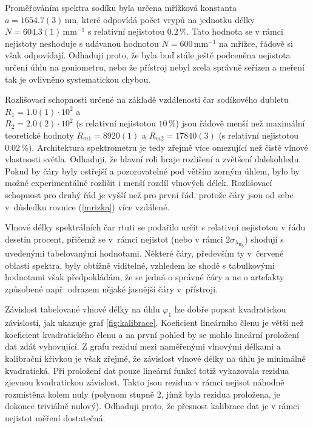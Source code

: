 \documentclass{../concepts/titul_protokol_p/prepareprotokol} %
\begin{document}
Proměřováním spektra sodíku byla určena mřížková konstanta $a = 1654.7(3)\,\mathrm{nm}$,
které odpovídá počet vrypů na jednotku délky $N = 604.3(1)\,\mathrm{mm^{-1}}$
s relativní nejistotou $0.2\,\%$. Tato hodnota se v rámci nejistoty neshoduje
s udávanou hodnotou $N = 600\,\mathrm{mm^{-1}}$ na mřížce, řádově si však
odpovídají. Odhaduji proto, že byla buď stále ještě podceněna nejistota
určení úhlu na goniometru, nebo že přístroj nebyl zcela správně seřízen
a meření tak je ovlivněno systematickou chybou.

Rozlišovací schopnosti určené na základě vzdálenosti čar sodíkového dubletu
$R_1 = 1.0(1) \cdot 10^2$ a \\ $R_2 = 2.0(2) \cdot 10^2$
(s relativní nejistotou $10\,\%$) jsou řádově menší
než maximální teoretické hodnoty $R_{m1} = 8920(1)$ a $R_{m2} = 17840(3)$
(s relativní nejistotou $0.02\,\%$).
Architektura spektrometru je tedy zřejmě více omezující než čistě vlnové 
vlastnosti světla. Odhaduji, že hlavní roli hraje rozlišení a zvětšení
dalekohledu. Pokud by čáry byly ostřejší a pozorovatelné pod větším
zorným úhlem, bylo by možné experimentálně rozlišit i menší rozdíl vlnových
délek. Rozlišovací schopnost pro druhý řád je vyšší než pro první řád,
protože čáry jsou od sebe v~důsledku rovnice (\ref{mrizka}) více vzdálené.

Vlnové délky spektrálních čar rtuti se podařilo určit s relativní nejistotou
v řádu desetin procent, přičemž se v~rámci nejistot (nebo v rámci $2 \sigma_{\lambda_\mathrm{Hg}}$)
shodují s uvedenými tabelovanými hodnotami. Některé čáry, především ty
v~červené oblasti spektra, byly obtížně viditelné, vzhledem ke shodě s tabulkovými
hodnotami však předpokládám, že se jedná o správné čáry a ne o artefakty
způsobené např. odrazem nějaké jasnější čáry v~přístroji.

Závislost tabelované vlnové délky na úhlu $\varphi_1$ lze dobře popsat
kvadratickou závislostí, jak ukazuje graf \ref{fig:kalibrace}. Koeficient
lineárního členu je větší než koeficient kvadratického členu a na první pohled
by se mohlo lineární proložení dat zdát vyhovující. Z grafu reziduí mezi
naměřenými vlnovými délkami a kalibrační křivkou je však zřejmé, že 
závislost vlnové délky na úhlu je minimálně kvadratická. Při proložení dat
pouze lineární funkcí totiž vykazovala rezidua zjevnou kvadratickou závislost.
Takto jsou rezidua v rámci nejisot náhodně rozmístěna kolem nuly (polynom stupně
2, jímž byla rezidua proložena, je dokonce triviálně nulový). Odhaduji proto,
že přesnost kalibrace dat je v rámci nejistot měření dostatečná.
\end{document}
